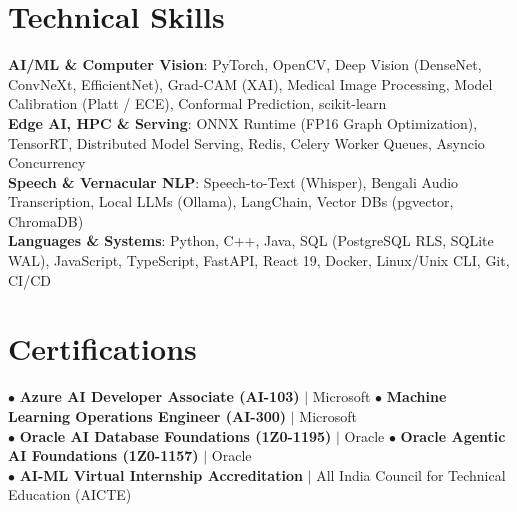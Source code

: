 \documentclass[letterpaper,10pt]{article}
\begin{document}
\section{Technical Skills}
 \begin{itemize}[leftmargin=0.15in, label={}]
    \small{\item{
     \textbf{AI/ML \& Computer Vision}{: PyTorch, OpenCV, Deep Vision (DenseNet, ConvNeXt, EfficientNet), Grad-CAM (XAI), Medical Image Processing, Model Calibration (Platt / ECE), Conformal Prediction, scikit-learn} \\
     \textbf{Edge AI, HPC \& Serving}{: ONNX Runtime (FP16 Graph Optimization), TensorRT, Distributed Model Serving, Redis, Celery Worker Queues, Asyncio Concurrency} \\
     \textbf{Speech \& Vernacular NLP}{: Speech-to-Text (Whisper), Bengali Audio Transcription, Local LLMs (Ollama), LangChain, Vector DBs (pgvector, ChromaDB)} \\
     \textbf{Languages \& Systems}{: Python, C++, Java, SQL (PostgreSQL RLS, SQLite WAL), JavaScript, TypeScript, FastAPI, React 19, Docker, Linux/Unix CLI, Git, CI/CD}
    }}
 \end{itemize}

\section{Certifications}
\vspace{-2pt}
\begin{itemize}[leftmargin=0.15in, label={}, noitemsep, topsep=-3pt]
    \small{\item{
     $\bullet$ \textbf{Azure AI Developer Associate (AI-103)} $|$ Microsoft \hfill $\bullet$ \textbf{Machine Learning Operations Engineer (AI-300)} $|$ Microsoft \\
     $\bullet$ \textbf{Oracle AI Database Foundations (1Z0-1195)} $|$ Oracle \hfill $\bullet$ \textbf{Oracle Agentic AI Foundations (1Z0-1157)} $|$ Oracle \\
     $\bullet$ \textbf{AI-ML Virtual Internship Accreditation} $|$ All India Council for Technical Education (AICTE)
    }}
\end{itemize}
\vspace{-6pt}

\end{document}
